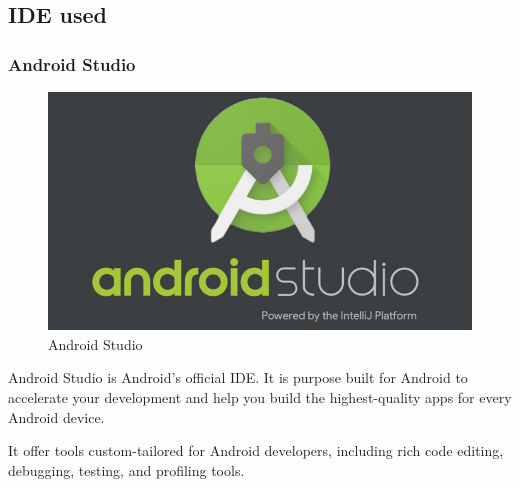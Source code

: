 \subsection{IDE used}
\subsubsection{Android Studio}

\begin{figure}[ht]
\centering
\includegraphics[scale=0.38]{images/android.png}
\caption{Android Studio}
\end{figure}

Android Studio is Android's official IDE. It is purpose built for Android to accelerate your development and help you build the highest-quality apps for every Android device.

It offer tools custom-tailored for Android developers, including rich code editing, debugging, testing, and profiling tools.

